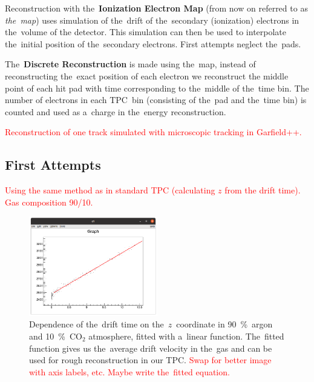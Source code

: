 \documentclass[]{article}
\begin{document}
	Reconstruction with the~\textbf{Ionization Electron Map} (from now on referred to as \emph{the~map}) uses simulation of the~drift of the~secondary (ionization) electrons in the~volume of the detector. This simulation can then be used to interpolate the~initial position of the~secondary electrons. First attempts neglect the~pads.
	
	The~\textbf{Discrete Reconstruction} is made using the~map, instead of reconstructing the~exact position of each electron we reconstruct the middle point of each hit pad with time corresponding to the~middle of the~time bin. The number of electrons in each TPC~bin (consisting of the~pad and the~time bin) is counted and used as a~charge in the~energy reconstruction.
	
	\textcolor{red}{Reconstruction of one track simulated with microscopic tracking in Garfield++.}
	
	\subsection{First Attempts}
	\textcolor{red}{Using the same method as in standard TPC (calculating $z$ from the drift time). Gas composition 90/10.}
	
	\begin{figure}
		\centering
		\includegraphics[width=0.5\textwidth]{9010_zt.png}
		\caption{Dependence of the~drift time on the~$z$~coordinate in 90~\%~argon and 10~\%~CO$_2$ atmosphere, fitted with a~linear function. The~fitted function gives us the~average drift velocity in the~gas and can be used for rough reconstruction in our TPC. \textcolor{red}{Swap for better image with axis labels, etc. Maybe write the~fitted equation.}}
		\label{fig:9010zt}
	\end{figure}
	
\end{document}
